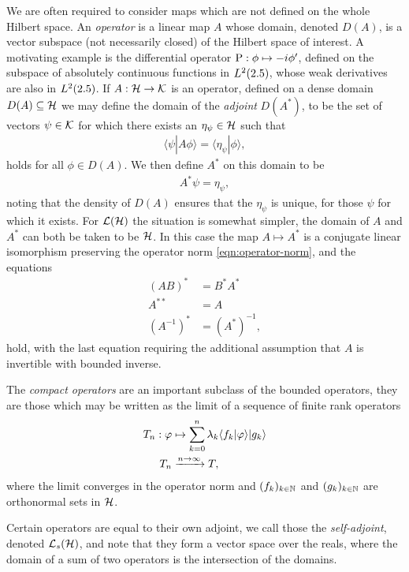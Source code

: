 We are often required to consider maps which are not defined on the whole Hilbert space. An \emph{operator} is a linear map $A$ whose domain, denoted $D(A)$, is a vector subspace (not necessarily closed) of the Hilbert space of interest. A motivating example is the differential operator $\operatorname{P}:\phi\mapsto -i \phi^\prime$, defined on the subspace of absolutely continuous functions in $L^2(2.5)$, whose weak derivatives are also in $L^2(2.5)$. If $A:\mathcal{H}\to\mathcal{K}$ is an operator, defined on a dense domain $D(A)\subseteq \mathcal{H}$ we may define the domain of the \emph{adjoint} $D(A^*)$, to be the set of vectors $\psi \in \mathcal{K}$ for which there exists an $\eta_{\psi}\in \mathcal{H}$ such that
\begin{align}
  \langle \psi | A\phi \rangle  = \langle \eta_{\psi}| \phi\rangle,
\end{align}
holds for all $\phi\in D(A)$. We then define $A^*$ on this domain to be
\begin{align}
  A^* \psi = \eta_{\psi},
\end{align}
noting that the density of $D(A)$ ensures that the $\eta_{\psi}$ is unique, for those $\psi$ for which it exists. For $\bops[\hcal]$ the situation is somewhat simpler, the domain of $A$ and $A^*$ can both be taken to be $\mathcal{H}$. In this case the map $A\mapsto A^*$ is a conjugate linear isomorphism preserving the operator norm \eqref{eqn:operator-norm}, and the equations
\begin{align}
  (AB)^* &= B^* A^*\\
  A^{**} &= A\\
  \left(A^{-1}\right)^* &= \left(A^*\right)^{-1},
\end{align}
hold, with the last equation requiring the additional assumption that $A$ is invertible with bounded inverse. 

The \emph{compact operators} are an important subclass of the bounded operators, they are those which may be written as the limit of a sequence of finite rank operators
\begin{align}
  T_n:\varphi&\mapsto\sum_{k=0}^n \lambda_k\langle f_k|\varphi\rangle | g_k \rangle \\
  T_n &\xrightarrow{n\to\infty} T,
\end{align}
where the limit converges in the operator norm and $(f_k)_{k\in \mathbb{N}}$ and $(g_k)_{k\in \mathbb{N}}$ are orthonormal sets in $\mathcal{H}$.

Certain operators are equal to their own adjoint, we call those the \emph{self-adjoint}, denoted $\saops[\hcal]$, and note that they form a vector space over the reals, where the domain of a sum of two operators is the intersection of the domains. 

